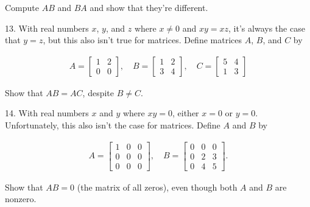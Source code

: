 \documentclass{article}
\begin{document}
Compute $AB$ and $BA$ and show that they're different.

13. With real numbers $x$, $y$, and $z$ where $x \neq 0$ and $xy = xz$, it's always the case that $y = z$, but this also isn't true for matrices. Define matrices $A$, $B$, and $C$ by

\begin{align*}
	A = \left[\begin{array}{cc}1& 2 \\ 0& 0\end{array}\right], \quad B = \left[\begin{array}{cc}1& 2 \\ 3& 4\end{array}\right], \quad C = \left[\begin{array}{cc}5& 4 \\ 1& 3\end{array}\right]
\end{align*}

Show that $AB = AC$, despite $B \neq C$.

14. With real numbers $x$ and $y$ where $xy = 0$, either $x = 0$ or $y = 0$. Unfortunately, this also isn't the case for matrices. Define $A$ and $B$ by

\begin{align*}
	A = \left[\begin{array}{ccc}1& 0& 0 \\ 0& 0& 0 \\ 0& 0& 0\end{array}\right], \quad B = \left[\begin{array}{ccc}0& 0& 0 \\ 0& 2& 3 \\ 0& 4& 5\end{array}\right].
\end{align*}

Show that $AB = 0$ (the matrix of all zeros), even though both $A$ and $B$ are nonzero.
\end{document}
